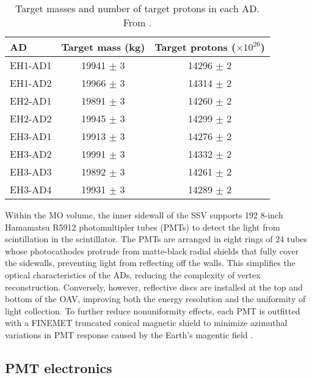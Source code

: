 \documentclass[../thesis.tex]{subfiles}
\begin{document}
\begin{table}[h]
  \begin{tabular}{lcc}
    \toprule
    AD & Target mass (kg) & Target protons ($\times 10^{26}$) \\
    \midrule
    EH1-AD1 & 19941 $\pm$ 3 & 14296 $\pm$ 2\\
    EH1-AD2 & 19966 $\pm$ 3 & 14314 $\pm$ 2\\
    EH2-AD1 & 19891 $\pm$ 3 & 14260 $\pm$ 2\\
    EH2-AD2 & 19945 $\pm$ 3 & 14299 $\pm$ 2\\
    EH3-AD1 & 19913 $\pm$ 3 & 14276 $\pm$ 2\\
    EH3-AD2 & 19991 $\pm$ 3 & 14332 $\pm$ 2\\
    EH3-AD3 & 19892 $\pm$ 3 & 14261 $\pm$ 2\\
    EH3-AD4 & 19931 $\pm$ 3 & 14289 $\pm$ 2\\
    \bottomrule
  \end{tabular}
  \caption{Target masses and number of target protons in each AD. From \cite{An_2017}.}
  \label{tab:targetMasses}
\end{table}

Within the MO volume, the inner sidewall of the SSV supports 192 8-inch Hamamatsu R5912 photomultipler tubes (PMTs) to detect the light from scintillation in the scintillator. The PMTs are arranged in eight rings of 24 tubes whose photocathodes protrude from matte-black radial shields that fully cover the sidewalls, preventing light from reflecting off the walls. This simplifies the optical characteristics of the ADs, reducing the complexity of vertex reconstruction. Conversely, however, reflective discs are installed at the top and bottom of the OAV, improving both the energy resolution and the uniformity of light collection. To further reduce nonuniformity effects, each PMT is outfitted with a FINEMET truncated conical magnetic shield to minimize azimuthal variations in PMT response caused by the Earth's magentic field \cite{DeVore:2013xma}.

\subsection{PMT electronics}
\label{sec:expPmtElec}
\end{document}
